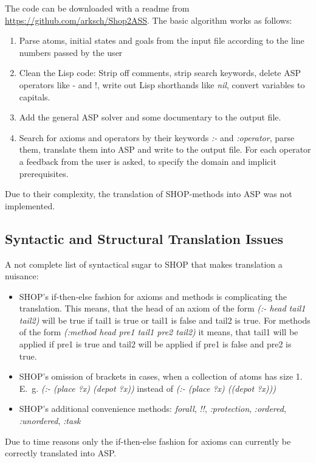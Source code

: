 \documentclass[10pt,a4paper]{article}
\begin{document}
The code can be downloaded with a readme from \url{https://github.com/arksch/Shop2ASS}. The basic algorithm works as follows:
\begin{enumerate}
\item Parse atoms, initial states and goals from the input file according to the line numbers passed by the user
\item Clean the Lisp code: Strip off comments, strip search keywords, delete ASP operators like - and !, write out Lisp shorthands like \textit{nil}, convert variables to capitals.
\item Add the general ASP solver and some documentary to the output file.
\item Search for axioms and operators by their keywords \textit{:-} and \textit{:operator}, parse them, translate them into ASP and write to the output file. For each operator a feedback from the user is asked, to specify the domain and implicit prerequisites.
\end{enumerate}

Due to their complexity, the translation of SHOP-methods into ASP was not implemented.

\subsection{Syntactic and Structural Translation Issues}\label{SyntStruc}

A not complete list of syntactical sugar to SHOP that makes translation a nuisance:
\begin{itemize}
\item SHOP's if-then-else fashion for axioms and methods is complicating the translation. This means, that the head of an axiom of the form \textit{(:- head tail1 tail2)} will be true if tail1 is true or tail1 is false and tail2 is true. For methods of the form \textit{(:method head pre1 tail1 pre2 tail2)} it means, that tail1 will be applied if pre1 is true and tail2 will be applied if pre1 is false and pre2 is true.
\item SHOP's omission of brackets in cases, when a collection of atoms has size 1. E.~g. \textit{(:- (place ?x) (depot ?x))} instead of \textit{(:- (place ?x) ((depot ?x)))}
\item SHOP's additional convenience methods: \textit{forall}, \textit{!!}, \textit{:protection}, \textit{:ordered}, \textit{:unordered}, \textit{:task}
\end{itemize} 

Due to time reasons only the if-then-else fashion for axioms can currently be correctly translated into ASP.
\end{document}
